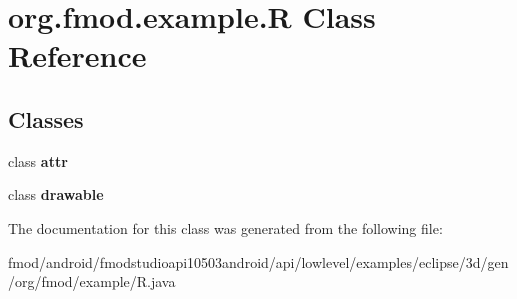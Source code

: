 \hypertarget{classorg_1_1fmod_1_1example_1_1_r}{\section{org.\+fmod.\+example.\+R Class Reference}
\label{classorg_1_1fmod_1_1example_1_1_r}
}
\subsection*{Classes}
\begin{DoxyCompactItemize}
\item 
class {\bfseries attr}
\item 
class {\bfseries drawable}
\end{DoxyCompactItemize}


The documentation for this class was generated from the following file\+:\begin{DoxyCompactItemize}
\item 
fmod/android/fmodstudioapi10503android/api/lowlevel/examples/eclipse/3d/gen/org/fmod/example/R.\+java\end{DoxyCompactItemize}
